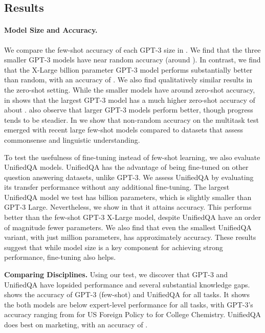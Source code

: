 \documentclass{article} \usepackage{iclr2021_conference, times}
\begin{document}
\subsection{Results}

\paragraph{Model Size and Accuracy.}


We compare the few-shot accuracy of each GPT-3 size in . We find that the three smaller GPT-3 models have near random accuracy (around ). In contrast, we find that the X-Large  billion parameter GPT-3 model performs substantially better than random, with an accuracy of . We also find qualitatively similar results in the zero-shot setting. While the smaller models have around  zero-shot accuracy,  in  shows that the largest GPT-3 model has a much higher zero-shot accuracy of about . \citet{brown2020gpt3} also observe that larger GPT-3 models perform better, though progress tends to be steadier. In  we show that non-random accuracy on the multitask test emerged with recent large few-shot models compared to datasets that assess commonsense and linguistic understanding.




To test the usefulness of fine-tuning instead of few-shot learning, we also evaluate UnifiedQA models. 
UnifiedQA has the advantage of being fine-tuned on other question answering datasets, unlike GPT-3. We assess UnifiedQA 
by evaluating its transfer performance without any additional fine-tuning. The largest UnifiedQA model we test has  billion parameters, which is slightly smaller than GPT-3 Large. Nevertheless, we show in  that it attains  accuracy. This performs better than the few-shot GPT-3 X-Large model, despite UnifiedQA have an order of magnitude fewer parameters. We also find that even the smallest UnifiedQA variant, with just  million parameters, has approximately  accuracy.
These results suggest that while model size is a key component for achieving strong performance, fine-tuning also helps.










\noindent\textbf{Comparing Disciplines.}\quad
Using our test, we discover that GPT-3 and UnifiedQA have lopsided performance and several substantial knowledge gaps.  shows the accuracy of GPT-3 (few-shot) and UnifiedQA for all  tasks. It shows the both models are below expert-level performance for all tasks, with GPT-3's accuracy ranging from  for US Foreign Policy to  for College Chemistry. UnifiedQA does best on marketing, with an accuracy of .
\end{document}
